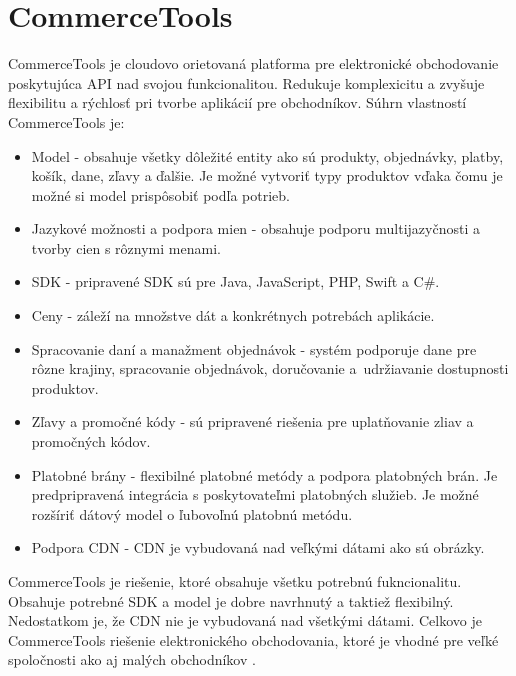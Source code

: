 \documentclass[
  printed, %
  table,   %
  lof,     %
  nolot,     %
  twoside,  
]{fithesis3}
\begin{document}
\section{CommerceTools}
CommerceTools je cloudovo orietovaná platforma pre elektronické obchodovanie poskytujúca API nad svojou funkcionalitou. Redukuje komplexicitu a zvyšuje flexibilitu a rýchlosť pri tvorbe aplikácií pre obchodníkov. Súhrn vlastností CommerceTools je:
\begin{itemize}
	\item Model - obsahuje všetky dôležité entity ako sú produkty, objednávky, platby, košík, dane, zľavy a ďalšie. Je možné vytvoriť typy produktov vďaka čomu je možné si model prispôsobiť podľa potrieb.
	\item Jazykové možnosti a podpora mien - obsahuje podporu multijazyčnosti a tvorby cien s rôznymi menami.
	\item SDK - pripravené SDK sú pre Java, JavaScript, PHP, Swift a C\#.
	\item Ceny - záleží na množstve dát a konkrétnych potrebách aplikácie.
	\item Spracovanie daní a manažment objednávok - systém podporuje dane pre rôzne krajiny, spracovanie objednávok, doručovanie a~udržiavanie dostupnosti produktov. 
	\item Zľavy a promočné kódy - sú pripravené riešenia pre uplatňovanie zliav a promočných kódov.
	\item Platobné brány - flexibilné platobné metódy a podpora platobných brán. Je predpripravená integrácia s poskytovateľmi platobných služieb. Je možné rozšíriť dátový model o ľubovoľnú platobnú metódu.
	\item Podpora CDN - CDN je vybudovaná nad veľkými dátami ako sú obrázky.
		\end{itemize}
CommerceTools je riešenie, ktoré obsahuje všetku potrebnú fukncionalitu. Obsahuje potrebné SDK a model je dobre navrhnutý a taktiež flexibilný. Nedostatkom je, že CDN nie je vybudovaná nad všetkými dátami. Celkovo je CommerceTools riešenie elektronického obchodovania, ktoré je vhodné pre veľké spoločnosti ako aj malých obchodníkov \cite{CommerceTools}.
\end{document}
